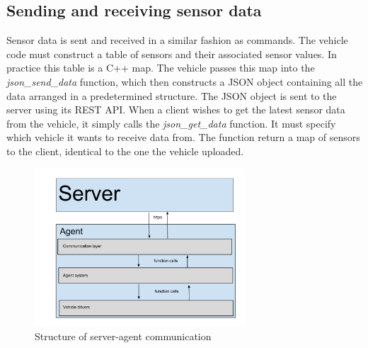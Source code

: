 \subsection{Sending and receiving sensor data}
Sensor data is sent and received in a similar fashion as commands.
The vehicle code must construct a table of sensors and their associated sensor values. 
In practice this table is a C++ map. 
The vehicle passes this map into the \textit{json\_send\_data} function, which then constructs a JSON object containing all the data arranged in a predetermined structure. 
The JSON object is sent to the server using its REST API.
When a client wishes to get the latest sensor data from the vehicle, it simply calls the \textit{json\_get\_data} function.
It must specify which vehicle it wants to receive data from.
The function return a map of sensors to the client, identical to the one the vehicle uploaded.

\begin{figure}[H]
    \centering
    \includegraphics[width=0.7\textwidth]{graphics/Agent_server_communication.png} 
    \caption{Structure of server-agent communication}
    \label{fig:agent_server_communication}
\end{figure}

